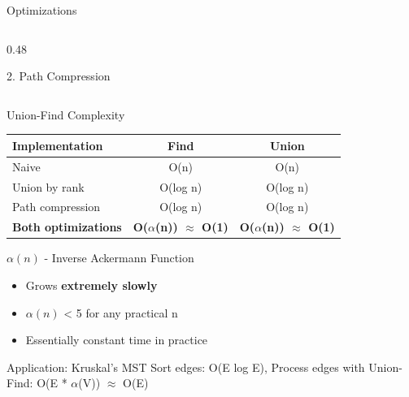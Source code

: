 \documentclass[aspectratio=169,xcolor=dvipsnames]{beamer}
\begin{document}
\begin{frame}{Optimizations}
\begin{columns}
\begin{column}{0.48\textwidth}
\begin{block}{2. Path Compression}
      \end{block}
    \end{column}
  \end{columns}
\end{frame}

\begin{frame}{Union-Find Complexity}
  \begin{table}
    \centering
    \begin{tabular}{l|c|c}
      \toprule
      \textbf{Implementation} & \textbf{Find} & \textbf{Union} \\
      \midrule
      Naive & O(n) & O(n) \\
      Union by rank & O(log n) & O(log n) \\
      Path compression & O(log n) & O(log n) \\
      \textbf{Both optimizations} & \textbf{O($\alpha$(n)) $\approx$ O(1)} & \textbf{O($\alpha$(n)) $\approx$ O(1)} \\
      \bottomrule
    \end{tabular}
  \end{table}

  \vspace{0.3cm}

  \begin{alertblock}{$\alpha(n)$ - Inverse Ackermann Function}
    \begin{itemize}
      \item Grows \textbf{extremely slowly}
      \item $\alpha(n)$ < 5 for any practical n
      \item Essentially constant time in practice
    \end{itemize}
  \end{alertblock}

  \begin{exampleblock}{Application: Kruskal's MST}
    Sort edges: O(E log E), Process edges with Union-Find: O(E * $\alpha$(V)) $\approx$ O(E)
  \end{exampleblock}
\end{frame}
\end{document}
